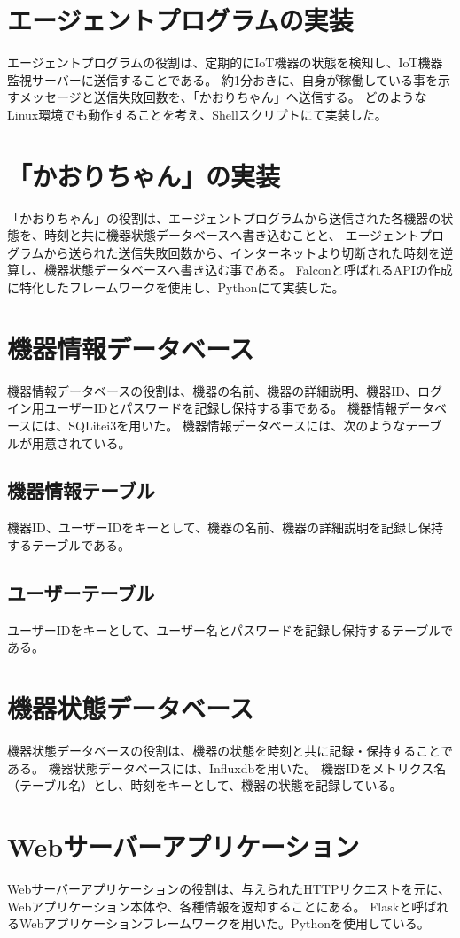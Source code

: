 \section{エージェントプログラムの実装}
エージェントプログラムの役割は、定期的にIoT機器の状態を検知し、IoT機器監視サーバーに送信することである。
約1分おきに、自身が稼働している事を示すメッセージと送信失敗回数を、「かおりちゃん」へ送信する。
どのようなLinux環境でも動作することを考え、Shellスクリプトにて実装した。

\section{「かおりちゃん」の実装}
「かおりちゃん」の役割は、エージェントプログラムから送信された各機器の状態を、時刻と共に機器状態データベースへ書き込むことと、
エージェントプログラムから送られた送信失敗回数から、インターネットより切断された時刻を逆算し、機器状態データベースへ書き込む事である。
Falconと呼ばれるAPIの作成に特化したフレームワークを使用し、Pythonにて実装した。

\section{機器情報データベース}
機器情報データベースの役割は、機器の名前、機器の詳細説明、機器ID、ログイン用ユーザーIDとパスワードを記録し保持する事である。
機器情報データベースには、SQLitei3を用いた。
機器情報データベースには、次のようなテーブルが用意されている。
\subsection{機器情報テーブル}
機器ID、ユーザーIDをキーとして、機器の名前、機器の詳細説明を記録し保持するテーブルである。
\subsection{ユーザーテーブル}
ユーザーIDをキーとして、ユーザー名とパスワードを記録し保持するテーブルである。

\section{機器状態データベース}
機器状態データベースの役割は、機器の状態を時刻と共に記録・保持することである。
機器状態データベースには、Influxdbを用いた。
機器IDをメトリクス名（テーブル名）とし、時刻をキーとして、機器の状態を記録している。

\section{Webサーバーアプリケーション}
Webサーバーアプリケーションの役割は、与えられたHTTPリクエストを元に、Webアプリケーション本体や、各種情報を返却することにある。
Flaskと呼ばれるWebアプリケーションフレームワークを用いた。Pythonを使用している。

